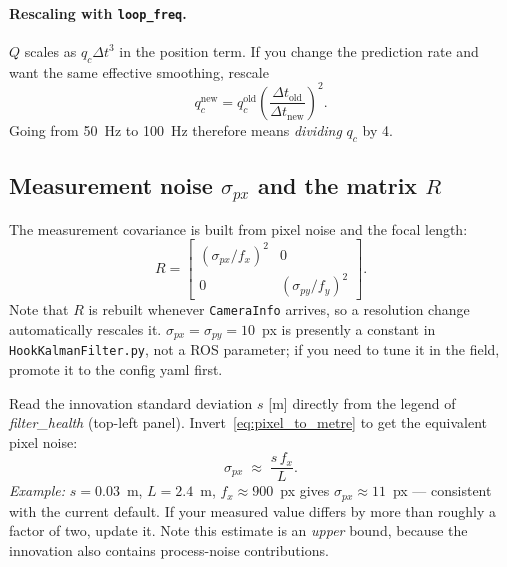 \documentclass[11pt,a4paper]{article}
\newcommand{\param}[1]{\texttt{\small #1}}
\newcommand{\topicname}[1]{\texttt{\small #1}}
\newcommand{\plot}[1]{\textit{#1}}
\begin{document}
\paragraph{Rescaling with \param{loop\_freq}.} $Q$ scales as $q_c\Delta t^3$ in
the position term. If you change the prediction rate and want the same
effective smoothing, rescale
%
\begin{equation}
q_c^{\text{new}} = q_c^{\text{old}}\left(\frac{\Delta t_{\text{old}}}{\Delta t_{\text{new}}}\right)^{2}.
\end{equation}
%
Going from 50~Hz to 100~Hz therefore means \emph{dividing} $q_c$ by 4.

\subsection{Measurement noise $\sigma_{px}$ and the matrix $R$}
\label{sec:sigma_px}

The measurement covariance is built from pixel noise and the focal length:
%
\begin{equation}
R = \begin{bmatrix}
(\sigma_{px}/f_x)^2 & 0\\
0 & (\sigma_{py}/f_y)^2
\end{bmatrix}.
\label{eq:R}
\end{equation}
%
Note that $R$ is rebuilt whenever \topicname{CameraInfo} arrives, so a
resolution change automatically rescales it. $\sigma_{px}=\sigma_{py}=10$~px is
presently a constant in \param{HookKalmanFilter.py}, not a ROS parameter; if
you need to tune it in the field, promote it to the config yaml first.

\begin{tcolorbox}[colback=blue!4,colframe=blue!45!black,title=\textbf{Calibrating $\sigma_{px}$ from a field run},fonttitle=\bfseries\small]
Read the innovation standard deviation $s$ [m] directly from the legend of
\plot{filter\_health} (top-left panel). Invert~\eqref{eq:pixel_to_metre} to get
the equivalent pixel noise:
\[
\sigma_{px} \;\approx\; \frac{s\, f_x}{L}.
\]
\emph{Example:} $s=0.03$~m, $L=2.4$~m, $f_x\approx900$~px gives
$\sigma_{px}\approx 11$~px --- consistent with the current default.
If your measured value differs by more than roughly a factor of two, update it.
Note this estimate is an \emph{upper} bound, because the innovation also
contains process-noise contributions.
\end{tcolorbox}
\end{document}
